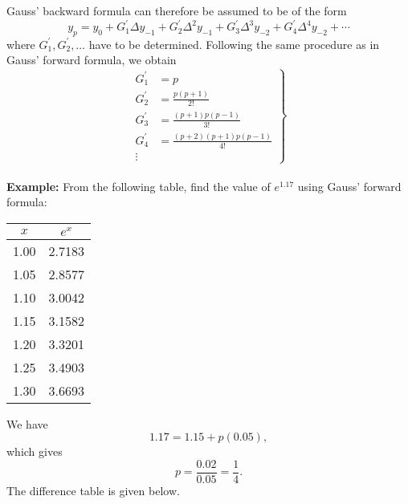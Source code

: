 \documentclass[12pt,a4paper,oneside]{book}
\begin{document}
Gauss' backward formula can therefore be assumed to be of the form
\begin{equation}\label{3.10}
	y_p=y_0+G_1^{\prime} \Delta y_{-1}+G_2^{\prime} \Delta^2 y_{-1}+G_3^{\prime} \Delta^3 y_{-2}+G_4^{\prime} \Delta^4 y_{-2}+\cdots
\end{equation}
where $G_1^{\prime}, G_2^{\prime}, \ldots$ have to be determined. Following the same procedure as in Gauss' forward formula, we obtain
\begin{equation}\label{3.11}
	\left.\begin{array}{rl}
		G_1^{\prime} & =p \\
		G_2^{\prime} & =\frac{p(p+1)}{2 !} \\
		G_3^{\prime} & =\frac{(p+1) p(p-1)}{3 !} \\
		G_4^{\prime} & =\frac{(p+2)(p+1) p(p-1)}{4 !} \\
		\vdots
	\end{array}\right\}
\end{equation}\\[1cm]
\textbf{Example:} From the following table, find the value of $e^{1.17}$ using Gauss' forward formula:\\
\begin{center}
	\begin{tabular}{cc}
		$x$ & $e^x$ \\
		\hline 1.00 & 2.7183 \\
		1.05 & 2.8577 \\
		1.10 & 3.0042 \\
		1.15 & 3.1582 \\
		1.20 & 3.3201 \\
		1.25 & 3.4903 \\
		1.30 & 3.6693 \\
		\hline
	\end{tabular}
\end{center}
We have
$$
1.17=1.15+p(0.05),
$$
which gives
$$
p=\frac{0.02}{0.05}=\frac{1}{4} .
$$
The difference table is given below.\\
\end{document}
